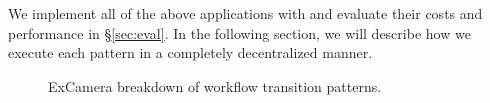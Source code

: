 We implement all of the above applications with \name{} and evaluate their
costs and performance in \S\ref{sec:eval}. In the following section, we will
describe how we execute each pattern in a completely decentralized manner.

\begin{figure}[t!]
	\centering
	\caption{ExCamera breakdown of workflow transition patterns. }
	\label{fig:excamera}
\end{figure}


